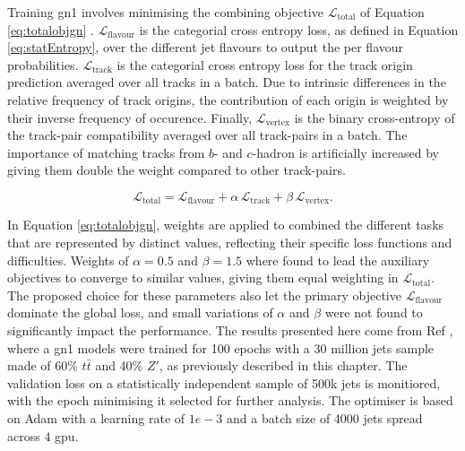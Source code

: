 Training \gls{gn1} involves minimising the combining objective $\mathcal{L}_{\textrm{total}}$ of Equation \ref{eq:totalobjgn} \cite{ATL-PHYS-PUB-2022-027}. $\mathcal{L}_{\textrm{flavour}}$ is the categorial cross entropy loss, as defined in Equation \ref{eq:statEntropy}, over the different jet flavours to output the per flavour probabilities. $\mathcal{L}_{\textrm{track}}$ is the categorial cross entropy loss for the track origin prediction averaged over all tracks in a batch. Due to intrinsic differences in the relative frequency of track origins, the contribution of each origin is weighted by their inverse frequency of occurence. Finally, $\mathcal{L}_{\textrm{vertex}}$ is the binary cross-entropy of the track-pair compatibility averaged over all track-pairs in a batch. The importance of matching tracks from $b$- and $c$-hadron is artificially increased by giving them double the weight compared to other track-pairs.

\begin{equation}\label{eq:totalobjgn}
  \mathcal{L}_{\textrm{total}} = \mathcal{L}_{\textrm{flavour}} + \alpha \, \mathcal{L}_{\textrm{track}} + \beta \, \mathcal{L}_{\textrm{vertex}}.
\end{equation}

In Equation \ref{eq:totalobjgn}, weights are applied to combined the different tasks that are represented by distinct values, reflecting their specific loss functions and difficulties. Weights of $\alpha = 0.5$ and $\beta = 1.5$ \cite{ATL-PHYS-PUB-2022-027} where found to lead the auxiliary objectives to converge to similar values, giving them equal weighting in $\mathcal{L}_{\textrm{total}}$. The proposed choice for these parameters also let the primary objective $\mathcal{L}_{\textrm{flavour}}$ dominate the global loss, and small variations of $\alpha$ and $\beta$ were not found to significantly impact the performance. The results presented here come from Ref \cite{ATL-PHYS-PUB-2022-027}, where a \gls{gn1} models were trained for 100 epochs with a 30 million jets sample made of 60\% $t\bar{t}$ and 40\% $Z'$, as previously described in this chapter. The validation loss on a statistically independent sample of 500k jets is monitiored, with the epoch minimising it selected for further analysis. The optimiser is based on Adam \cite{adamPaper} with a learning rate of $1e-3$ and a batch size of 4000 jets spread across 4 \gls{gpu}. \\

